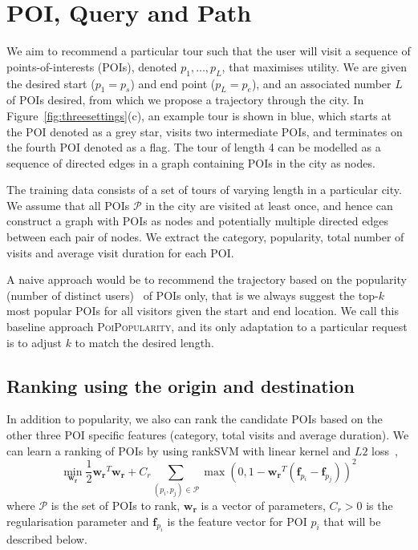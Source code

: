 
\section{POI, Query and Path}
\label{sec:method}

We aim to recommend a particular tour such that the user will visit a sequence of points-of-interests (POIs), denoted $p_1, \ldots, p_L$, that maximises utility. We are given the desired start ($p_1=p_s$) and end point ($p_L=p_e$), and an associated number $L$ of POIs desired, from which we propose a trajectory through the city. In Figure~\ref{fig:threesettings}(c), an example tour is shown in blue, which starts at the POI denoted as a grey star, visits two intermediate POIs, and terminates on the fourth POI denoted as a flag. The tour of length 4 can be modelled as a sequence of directed edges in a graph containing POIs in the city as nodes.

The training data consists of a set of tours of varying length in a particular city. We assume that all POIs $\mathcal{P}$ in the city are visited at least once, and hence can construct a graph with POIs as nodes and potentially multiple directed edges between each pair of nodes. We extract the category, popularity, total number of visits and average visit duration for each POI.

A naive approach would be to
recommend the trajectory based on the popularity (number of distinct users)~\cite{ht10} of POIs only, that is we always suggest the top-$k$ most popular POIs for all visitors given the start and end location. We call this baseline approach \textsc{PoiPopularity}, and its only adaptation to a particular request is to adjust $k$ to match the desired length.

\subsection{Ranking using the origin and destination}
\label{sec:ranksvm}

In addition to popularity, we also can rank the candidate POIs based on the other three POI specific features (category, total visits and average duration).
We can learn a ranking of POIs by using rankSVM with linear kernel and $L2$ loss~\cite{lranksvm},
\begin{displaymath}
\min_{\mathbf{w_r}} \frac{1}{2} \mathbf{w_r}^T \mathbf{w_r} +
                    C_r \sum_{(p_i, p_j) \in \mathcal{P}}
                    \max \left( 0, 1 - \mathbf{w_r}^T (\mathbf{f}_{p_i} - \mathbf{f}_{p_j}) \right)^2
\end{displaymath}
where $\mathcal{P}$ is the set of POIs to rank,
$\mathbf{w_r}$ is a vector of parameters,
$C_r > 0$ is the regularisation parameter and
$\mathbf{f}_{p_i}$ is the feature vector for POI $p_i$ that will be described below.

